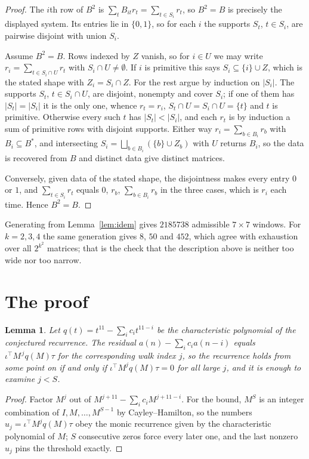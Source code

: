\documentclass[11pt,a4paper]{article}
\theoremstyle{plain}
\newtheorem{lemma}[theorem]{Lemma}
\theoremstyle{definition}
\begin{document}
\begin{proof}
The $i$th row of $B^2$ is $\sum_t B_{it}r_t=\sum_{t\in S_i}r_t$, so $B^2=B$ is precisely the
displayed system. Its entries lie in $\{0,1\}$, so for each $i$ the supports $S_t$,
$t\in S_i$, are pairwise disjoint with union $S_i$.

Assume $B^2=B$. Rows indexed by $Z$ vanish, so for $i\in U$ we may write
$r_i=\sum_{t\in S_i\cap U}r_t$ with $S_i\cap U\neq\emptyset$. If $i$ is primitive this says
$S_i\subseteq\{i\}\cup Z$, which is the stated shape with $Z_i=S_i\cap Z$. For the rest argue
by induction on $|S_i|$. The supports $S_t$, $t\in S_i\cap U$, are disjoint, nonempty and
cover $S_i$; if one of them has $|S_t|=|S_i|$ it is the only one, whence $r_t=r_i$,
$S_t\cap U=S_i\cap U=\{t\}$ and $t$ is primitive. Otherwise every such $t$ has
$|S_t|<|S_i|$, and each $r_t$ is by induction a sum of primitive rows with disjoint supports.
Either way $r_i=\sum_{b\in B_i}r_b$ with $B_i\subseteq B^{\ast}$, and intersecting
$S_i=\bigsqcup_{b\in B_i}(\{b\}\cup Z_b)$ with $U$ returns $B_i$, so the data is recovered
from $B$ and distinct data give distinct matrices.

Conversely, given data of the stated shape, the disjointness makes every entry $0$ or $1$, and
$\sum_{t\in S_i}r_t$ equals $0$, $r_b$, $\sum_{b\in B_i}r_b$ in the three cases, which is
$r_i$ each time. Hence $B^2=B$.
\end{proof}

Generating from Lemma~\ref{lem:idem} gives $2185738$ admissible $7\times7$ windows. For
$k=2,3,4$ the same generation gives $8$, $50$ and $452$, which agree with exhaustion over all
$2^{k^2}$ matrices; that is the check that the description above is neither too wide nor too
narrow.

\section{The proof}

\begin{lemma}\label{lem:crit}
Let $q(t)=t^{11}-\sum_i c_it^{11-i}$ be the characteristic polynomial of the
conjectured recurrence. The residual $a(n)-\sum_ic_ia(n-i)$ equals
$\iota^{\!\top}M^{\,j}q(M)\tau$ for the corresponding walk index $j$, so the recurrence
holds from some point on if and only if $\iota^{\!\top}M^{j}q(M)\tau=0$ for all large $j$,
and it is enough to examine $j<S$.
\end{lemma}

\begin{proof}
Factor $M^{j}$ out of $M^{j+11}-\sum_ic_iM^{j+11-i}$. For the bound, $M^{S}$
is an integer combination of $I,M,\dots,M^{S-1}$ by Cayley--Hamilton, so the numbers
$u_j=\iota^{\!\top}M^{j}q(M)\tau$ obey the monic recurrence given by the characteristic
polynomial of $M$; $S$ consecutive zeros force every later one, and the last nonzero $u_j$
pins the threshold exactly.
\end{proof}
\end{document}
